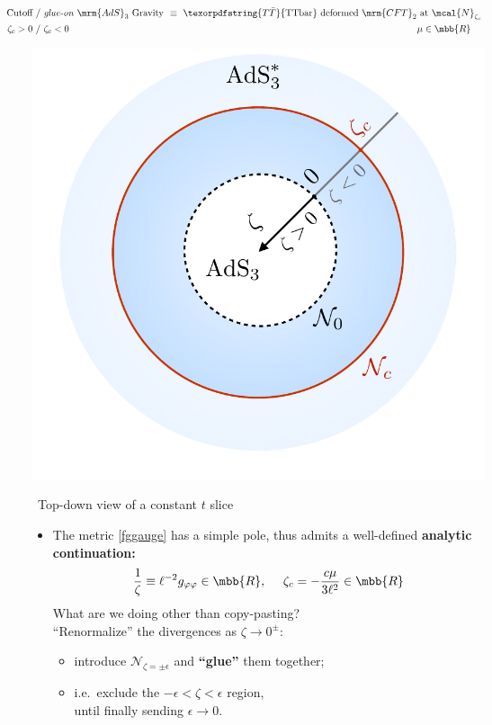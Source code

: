 \documentclass[10pt]{article}
\newcommand{\TTbar}{\texorpdfstring{\ensuremath{T\bar{T}}}{TTbar}\xspace}
\begin{document}
\begin{multicols}{3}
\parbox{\linewidth}{
\vspace{-\baselineskip}
\textbf{\begin{equation*}
\hspace{-3em}
\begin{aligned}
	\textrm{Cutoff}
	\ &/\ %
	\text{\textit{glue-on} $\mrm{AdS}_3$ Gravity}
	\!\!&\equiv\ %
	\textrm{\TTbar deformed $\mrm{CFT}_2$ at $\mcal{N}_{\zeta_c}$} \\
	\zeta_c > 0
	\ &/\ %
	\zeta_c < 0
	& \mu \in \mbb{R}\hspace{1em}\,
\end{aligned}
\end{equation*}}
\begin{center}
	\vspace{-1\baselineskip}%
	\centering
	\includegraphics[width=.7\linewidth]{img/diagram.pdf}
	
	\vspace{-.45\baselineskip}
	\scriptsize\ Top-down view of a constant $t$ slice
\end{center}
}

\begin{itemize}

\item The metric \eqref{fggauge} has a simple pole, thus admits a well-defined \textbf{analytic continuation:}
\begin{equation}
	\frac{1}{\zeta} \equiv \ell^{-2} g_{\varphi\varphi} \in \mbb{R},
\ \quad
	\zeta_c = - \frac{c \mu}{3\ell^2} \in \mbb{R}
\end{equation}
What are we doing other than copy-pasting?\\
``Renormalize'' the divergences as $\zeta \to 0^\pm$:
	\begin{itemize}[noitemsep]\small
	\item introduce $\mathcal N_{\zeta={\pm\epsilon}}$ and \textbf{``glue''} them together;
	\item i.e.~exclude the $-\epsilon < \zeta < \epsilon$ region, \\ until finally sending $\epsilon \to 0$. 
	\end{itemize}
	

\end{itemize}
\end{multicols}
\end{document}

